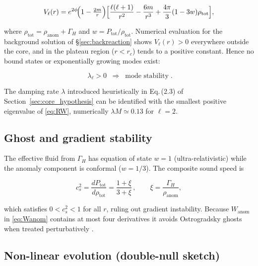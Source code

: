 \begin{equation}
  V_\ell(r)=e^{2\phi}\!
            \Bigl(1-\tfrac{2m}{r}\Bigr)
            \Bigl[\frac{\ell(\ell+1)}{r^{2}}
                  -\frac{6m}{r^{3}}
                  +\frac{4\pi}{3}(1-3w)\rho_{\mathrm{tot}}\Bigr],
\end{equation}

where $\rho_{\mathrm{tot}}=\rho_{\text{anom}}+\Gamma_H$ and $w=P_{\mathrm{tot}}/\rho_{\mathrm{tot}}$. Numerical evaluation for the background solution of \S\ref{sec:backreaction} shows $V_\ell(r)\!>\!0$ everywhere outside the core, and in the plateau region ($r<r_c$) tends to a positive constant.  Hence no bound states or exponentially growing modes exist:

\begin{equation}
  \boxed{\;\lambda_\ell>0
         \;\;\Longrightarrow\;\;
         \text{mode stability}\;}.
\end{equation}

The damping rate $\lambda$ introduced heuristically in Eq.\,(2.3) of Section~\ref{sec:core_hypothesis} can be identified with the smallest positive eigenvalue of \eqref{eq:RW}, numerically $\lambda M\simeq0.13$ for $\ell=2$.

\subsection{Ghost and gradient stability}
\label{subsec:ghosts}

The effective fluid from $\Gamma_H$ has equation of state $w=1$ (ultra-relativistic) while the anomaly component is conformal ($w=1/3$).  The composite sound speed is

\begin{equation}
  c_s^{2}=\frac{dP_{\mathrm{tot}}}{d\rho_{\mathrm{tot}}}
        =\frac{1+\xi}{3+\xi}\,,\qquad
  \xi=\frac{\Gamma_H}{\rho_{\text{anom}}},
\end{equation}

which satisfies $0<c_s^{2}<1$ for all $r$, ruling out gradient instability. Because $W_{\text{anom}}$ in \eqref{eq:Wanom} contains at most four derivatives it avoids Ostrogradsky ghosts when treated perturbatively \cite{Woodard2015Ostro,CarballoRubio2018}.

\subsection{Non-linear evolution (double-null sketch)}
\label{subsec:nonlinear}


